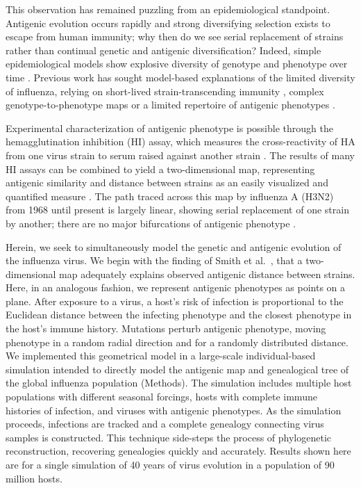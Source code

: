 This observation has remained puzzling from an epidemiological standpoint.  Antigenic evolution occurs rapidly and strong diversifying selection exists to escape from human immunity; why then do we see serial replacement of strains rather than continual genetic and antigenic diversification?  Indeed, simple epidemiological models show explosive diversity of genotype and phenotype over time \cite{Ferguson03,Tria05}.  Previous work has sought model-based explanations of the limited diversity of influenza, relying on short-lived strain-transcending immunity \cite{Ferguson03,Tria05}, complex genotype-to-phenotype maps \cite{Koelle06} or a limited repertoire of antigenic phenotypes \cite{Recker07}. 

Experimental characterization of antigenic phenotype is possible through the hemagglutination inhibition (HI) assay, which measures the cross-reactivity of HA from one virus strain to serum raised against another strain \cite{Hirst43}.  The results of many HI assays can be combined to yield a two-dimensional map, representing antigenic similarity and distance between strains as an easily visualized and quantified measure \cite{Smith04}.  The path traced across this map by influenza A (H3N2) from 1968 until present is largely linear, showing serial replacement of one strain by another; there are no major bifurcations of antigenic phenotype \cite{Smith04}.

Herein, we seek to simultaneously model the genetic and antigenic evolution of the influenza virus.  We begin with the finding of Smith et al.\ \cite{Smith04}, that a two-dimensional map adequately explains observed antigenic distance between strains.  Here, in an analogous fashion, we represent antigenic phenotypes as points on a plane.  After exposure to a virus, a host's risk of infection is proportional to the Euclidean distance between the infecting phenotype and the closest phenotype in the host's immune history.  Mutations perturb antigenic phenotype, moving phenotype in a random radial direction and for a randomly distributed distance.  We implemented this geometrical model in a large-scale individual-based simulation intended to directly model the antigenic map and genealogical tree of the global influenza population (Methods).  The simulation includes multiple host populations with different seasonal forcings, hosts with complete immune histories of infection, and viruses with antigenic phenotypes.  As the simulation proceeds, infections are tracked and a complete genealogy connecting virus samples is constructed.  This technique side-steps the process of phylogenetic reconstruction, recovering genealogies quickly and accurately.  Results shown here are for a single simulation of 40 years of virus evolution in a population of 90 million hosts.  

